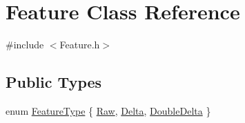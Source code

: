 \hypertarget{class_feature}{\section{Feature Class Reference}
\label{class_feature}
}


{\ttfamily \#include $<$Feature.\+h$>$}

\subsection*{Public Types}
\begin{DoxyCompactItemize}
\item 
enum \hyperlink{class_feature_afa43293b1c8369e9ff47f6eedb7ad264}{Feature\+Type} \{ \hyperlink{class_feature_afa43293b1c8369e9ff47f6eedb7ad264ad1f562be2a0e47fb440219948324ab11}{Raw}, 
\hyperlink{class_feature_afa43293b1c8369e9ff47f6eedb7ad264aff7fd054901faaf35c8d02a3aeefef66}{Delta}, 
\hyperlink{class_feature_afa43293b1c8369e9ff47f6eedb7ad264ac9a34ecf21436bc7a31921d2956b1680}{Double\+Delta}
 \}
\end{DoxyCompactItemize}
